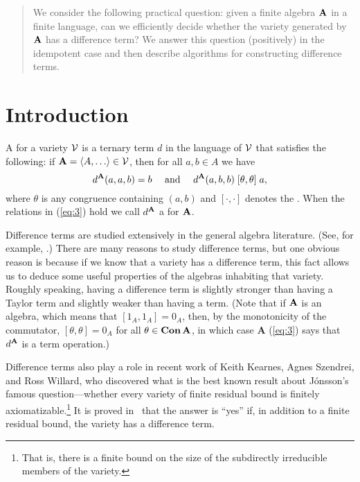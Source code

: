 \begin{abstract}
We consider the following practical question: given a finite 
algebra $\mathbf{A}$ in a
finite language, can we efficiently decide whether the variety 
generated by $\mathbf{A}$
has a difference term?  We answer this question (positively) in the 
idempotent case and then describe algorithms for constructing difference 
terms.
\end{abstract}

\section{Introduction}
\label{sec:introduction}

A  for a variety $\mathcal{V}$ is a ternary term $d$ in the
language of $\mathcal{V}$ that satisfies the following:
if $\alg{A} = \<A, \dots \> \in \sV$, then for all $a, b \in A$ we have
\begin{equation}
\label{eq:3}  
d^{\mathbf{A}}(a,a,b) = b \quad \text{ and } \quad
d^{\mathbf{A}}(a,b,b) \mathrel{[\theta, \theta]} a,
\end{equation}
where $\theta$ is any congruence %
containing $(a,b)$
and $[\cdot, \cdot]$ denotes the .
When the relations in (\ref{eq:3}) hold we call $d^{\mathbf{A}}$
a  for $\mathbf{A}$.

Difference terms are studied extensively in the general algebra literature.
(See, for example, \cite{MR1358491,MR1663558,MR3076179,KSW,MR3449235}.)
There are many reasons to study difference terms, but
one obvious reason is because if we know that a variety 
has a difference term, this fact allows us to deduce some useful
properties of the algebras inhabiting that variety.
Roughly speaking, having a difference term is slightly stronger than having
a Taylor term and slightly weaker than having a \malcev term.
(Note that if
$\mathbf{A}$ is an  algebra, which means 
that $[1_A, 1_A] = 0_A$, then, by
the monotonicity of the commutator,
$[\theta, \theta] = 0_A$ for all $\theta \in \operatorname{\mathbf{Con}} \mathbf{A}$, 
in which case $\textbf{A}$
(\ref{eq:3}) says that $d^{\mathbf{A}}$ is a \malcev term operation.)

Difference terms also play a role in recent work of Keith Kearnes, Agnes Szendrei, and Ross Willard, who discovered what is the best known result about 
J\'onsson's famous question---whether
every variety of finite residual bound is finitely 
axiomatizable.\footnote{That is, there is a finite bound on the size of the   subdirectly irreducible members of the variety.}
It is proved in~\cite{MR3449235} that the answer 
is ``yes'' if, in addition to a finite residual bound, 
the variety has a difference term.


